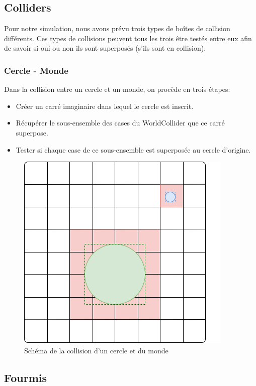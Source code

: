 \documentclass{EPUProjetDi}
\begin{document}
\subsection{Colliders}

Pour notre simulation, nous avons prévu trois types de boîtes de collision différents. Ces types de collisions
peuvent tous les trois être testés entre eux afin de savoir si oui ou non ils sont superposés (s'ils sont en collision).

\subsubsection*{Cercle - Monde}

Dans la collision entre un cercle et un monde, on procède en trois étapes:
\begin{itemize}
    \item Créer un carré imaginaire dans lequel le cercle est inscrit.
    \item Récupérer le sous-ensemble des cases du WorldCollider que ce carré superpose.
    \item Tester si chaque case de ce sous-ensemble est superposée au cercle d'origine.
\end{itemize}

\begin{figure}[h]
    \centering
    \includegraphics[scale=0.6]{world_collider_circle.png}
    \caption{Schéma de la collision d'un cercle et du monde}
    \label{fig:world_collider_circle}
\end{figure}

\pagebreak

\subsection{Fourmis}
\end{document}
